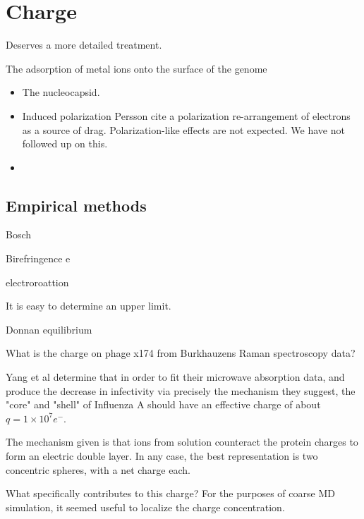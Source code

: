 \documentclass[paper.tex]{subfiles}
\begin{document}
\section{Charge}


\begin{autem}
Deserves a more detailed treatment.
\end{autem}


The adsorption of metal ions onto the surface of the genome
\begin{itemize}
\item The nucleocapsid. 
\item Induced polarization
		Persson cite a polarization re-arrangement of electrons as a source of drag. Polarization-like effects are not expected. We have not followed up on this.
\item 
\end{itemize}		




\subsection{Empirical methods}




Bosch \cite{Studies1985}



Birefringence e


electroroattion 


It is easy to determine an upper limit.




Donnan equilibrium

\begin{autem}
	What is the charge on phage x174 from Burkhauzens Raman spectroscopy data?
\end{autem}

Yang et al determine that in order to fit their microwave absorption data, and produce the decrease in infectivity via precisely the mechanism they suggest, the "core" and "shell" of Influenza A should have an effective charge of about $q=1 \times 10^7 e^-$. 

The mechanism given is that ions from solution counteract the protein charges to form an electric double layer. In any case, the best representation is two concentric spheres, with a net charge each.

What specifically contributes to this charge? For the purposes of coarse MD simulation, it seemed useful to localize the charge concentration. 
\end{document}
